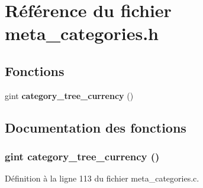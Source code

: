 \section{Référence du fichier meta\_\-categories.h}
\label{meta__categories_8h}
\subsection*{Fonctions}
\begin{DoxyCompactItemize}
\item 
gint {\bf category\_\-tree\_\-currency} ()
\end{DoxyCompactItemize}


\subsection{Documentation des fonctions}
\subsubsection[{category\_\-tree\_\-currency}]{\setlength{\rightskip}{0pt plus 5cm}gint category\_\-tree\_\-currency ()}\label{meta__categories_8h_a5afe991662ce3aa2469efb6284d91a5e}


Définition à la ligne 113 du fichier meta\_\-categories.c.

